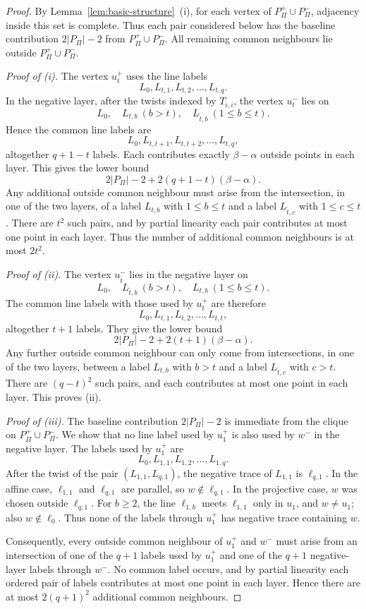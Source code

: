 \documentclass[reqno,a4paper,11pt]{article}
\theoremstyle{definition}
\theoremstyle{remark}
\begin{document}
\begin{proof}
	By Lemma~\ref{lem:basic-structure}~(i), for each vertex of $P_\Pi^+\cup P_\Pi^-$, adjacency inside this set is complete.
Thus each pair considered below has the baseline contribution $2|P_\Pi|-2$ from $P_\Pi^+\cup P_\Pi^-$.
All remaining common neighbours lie outside $P_\Pi^+\cup P_\Pi^-$.

\smallskip
\noindent\emph{Proof of (i).}
The vertex $u_t^+$ uses the line labels
\[
L_0,L_{t,1},L_{t,2},\ldots,L_{t,q}.
\]
In the negative layer, after the twists indexed by $T_{i,i}$, the vertex $u_t^-$ lies on
\[
L_0,
\quad L_{t,b}\ (b>t),
\quad L_{\widetilde t,b}\ (1\le b\le t).
\]
Hence the common line labels are
\[
L_0,L_{t,t+1},L_{t,t+2},\ldots,L_{t,q},
\]
altogether $q+1-t$ labels.
Each contributes exactly $\beta-\alpha$ outside points in each layer.
This gives the lower bound
\[
2|P_\Pi|-2+2(q+1-t)(\beta-\alpha).
\]
Any additional outside common neighbour must arise from the intersection, in one of the two layers, of a label $L_{t,b}$ with $1\le b\le t$ and a label $L_{\widetilde t,c}$ with $1\le c\le t$.
There are $t^2$ such pairs, and by partial linearity each pair contributes at most one point in each layer.
Thus the number of additional common neighbours is at most $2t^2$.

\smallskip
\noindent\emph{Proof of (ii).}
The vertex $u_{\widetilde t}^-$ lies in the negative layer on
\[
L_0,
\quad L_{\widetilde t,b}\ (b>t),
\quad L_{t,b}\ (1\le b\le t).
\]
The common line labels with those used by $u_t^+$ are therefore
\[
L_0,L_{t,1},L_{t,2},\ldots,L_{t,t},
\]
altogether $t+1$ labels.
They give the lower bound
\[
2|P_\Pi|-2+2(t+1)(\beta-\alpha).
\]
Any further outside common neighbour can only come from intersections, in one of the two layers, between a label $L_{t,b}$ with $b>t$ and a label $L_{\widetilde t,c}$ with $c>t$.
There are $(q-t)^2$ such pairs, and each contributes at most one point in each layer.
This proves (ii).

\smallskip
\noindent\emph{Proof of (iii).}
The baseline contribution $2|P_\Pi|-2$ is immediate from the clique on $P_\Pi^+\cup P_\Pi^-$.
We show that no line label used by $u_1^+$ is also used by $w^-$ in the negative layer.
The labels used by $u_1^+$ are
\[
L_0,L_{1,1},L_{1,2},\ldots,L_{1,q}.
\]
After the twist of the pair $(L_{1,1},L_{q,1})$, the negative trace of $L_{1,1}$ is $\ell_{q,1}$.
In the affine case, $\ell_{1,1}$ and $\ell_{q,1}$ are parallel, so $w\notin\ell_{q,1}$.
In the projective case, $w$ was chosen outside $\ell_{q,1}$.
For $b\ge2$, the line $\ell_{1,b}$ meets $\ell_{1,1}$ only in $u_1$, and $w\ne u_1$; also $w\notin\ell_0$.
Thus none of the labels through $u_1^+$ has negative trace containing $w$.

Consequently, every outside common neighbour of $u_1^+$ and $w^-$ must arise from an intersection of one of the $q+1$ labels used by $u_1^+$ and one of the $q+1$ negative-layer labels through $w^-$.
No common label occurs, and by partial linearity each ordered pair of labels contributes at most one point in each layer.
Hence there are at most $2(q+1)^2$ additional common neighbours.
\end{proof}
\end{document}
